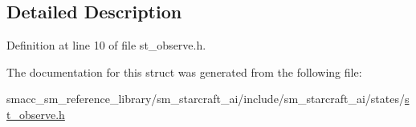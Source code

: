 \subsection{Detailed Description}


Definition at line 10 of file st\+\_\+observe.\+h.



The documentation for this struct was generated from the following file\+:\begin{DoxyCompactItemize}
\item 
smacc\+\_\+sm\+\_\+reference\+\_\+library/sm\+\_\+starcraft\+\_\+ai/include/sm\+\_\+starcraft\+\_\+ai/states/\hyperlink{st__observe_8h}{st\+\_\+observe.\+h}\end{DoxyCompactItemize}
